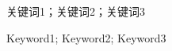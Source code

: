 

\begin{chineseabstract}
	{关键词1；关键词2；关键词3}%

\end{chineseabstract}

\clearpage


\begin{englishabstract}
	{Keyword1; Keyword2; Keyword3}%

\end{englishabstract}
